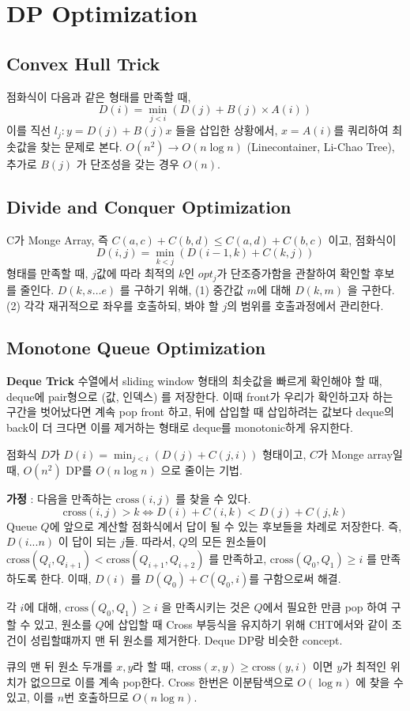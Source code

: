 \footnotesize
\chapter{DP Optimization}
\section{Convex Hull Trick}
점화식이 다음과 같은 형태를 만족할 때,
$$D(i) = \min_{j < i} (D(j) + B(j) \times A(i))$$
이를 직선 $l_j : y = D(j) + B(j) x$ 들을 삽입한 상황에서, $x = A(i)$를 쿼리하여 최솟값을 찾는 문제로 본다.
$O(n^2) \to O(n \log n)$ (Linecontainer, Li-Chao Tree), 추가로 $B(j)$ 가 단조성을 갖는 경우 $O(n)$.

\section{Divide and Conquer Optimization}
C가 Monge Array, 즉 $C(a, c) + C(b, d) \leq C(a, d) + C(b, c)$ 이고, 점화식이 
$$D(i, j) = \min_{k < j} (D(i-1, k) + C(k, j))$$
형태를 만족할 때, $j$값에 따라 최적의 $k$인 $opt_j$가 단조증가함을 관찰하여 확인할 후보를 줄인다. $D(k, s\dots e)$ 를 구하기 위해, 
(1) 중간값 $m$에 대해 $D(k, m)$ 을 구한다. (2) 각각 재귀적으로 좌우를 호출하되, 봐야 할 $j$의 범위를 호출과정에서 관리한다.

\section{Monotone Queue Optimization}
\textbf{Deque Trick}
수열에서 sliding window 형태의 최솟값을 빠르게 확인해야 할 때, deque에 pair형으로 (값, 인덱스) 를 저장한다. 이때 front가 우리가 확인하고자 하는 구간을 벗어났다면 계속 pop front 하고, 뒤에 삽입할 때 삽입하려는 값보다 deque의 back이 더 크다면 이를 제거하는 형태로 deque를 monotonic하게 유지한다. 

점화식 $D$가 $D(i) = \min_{j < i} (D(j) + C(j, i))$ 형태이고, $C$가 Monge array일 때, $O(n^2)$ DP를 $O(n \log n)$ 으로 줄이는 기법. 

\textbf{가정} : 다음을 만족하는 $\text{cross}(i, j)$ 를 찾을 수 있다. 
$$\text{cross}(i, j) > k \iff D(i) + C(i, k) < D(j) + C(j, k)$$
Queue $Q$에 앞으로 계산할 점화식에서 답이 될 수 있는 후보들을 차례로 저장한다. 즉, $D(i...n)$ 이 답이 되는 $j$들. 따라서, $Q$의 모든 원소들이 
$\text{cross}(Q_i, Q_{i+1}) < \text{cross}(Q_{i+1}, Q_{i+2})$ 를 만족하고, $\text{cross}(Q_0, Q_1) \geq i$ 를 만족하도록 한다. 이때, $D(i)$ 를 $D(Q_0) + C(Q_0, i)$를 구함으로써 해결. 

각 $i$에 대해, $\text{cross}(Q_0, Q_1) \geq i$ 을 만족시키는 것은 $Q$에서 필요한 만큼 pop 하여 구할 수 있고, 원소를 $Q$에 삽입할 때 Cross 부등식을 유지하기 위해 CHT에서와 같이 조건이 성립할떄까지 맨 뒤 원소를 제거한다. Deque DP랑 비슷한 concept. 

큐의 맨 뒤 원소 두개를 $x, y$라 할 때, $\text{cross}(x, y) \geq \text{cross}(y, i)$ 이면 $y$가 최적인 위치가 없으므로 이를 계속 pop한다. Cross 한번은 이분탐색으로 $O(\log n)$ 에 찾을 수 있고, 이를 $n$번 호출하므로 $O(n \log n)$.